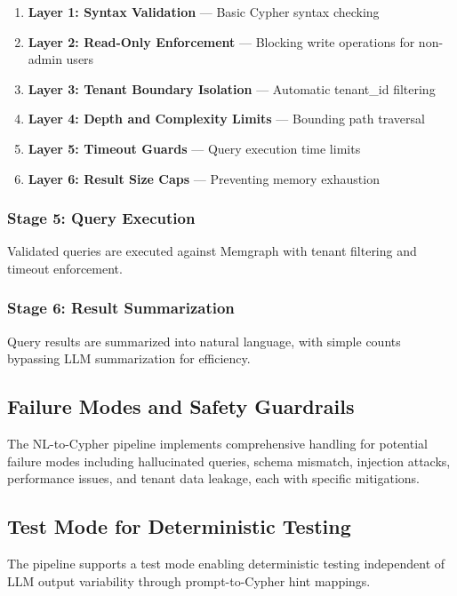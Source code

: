 \documentclass[a4paper,twoside]{sapthesis}
\begin{document}
\begin{enumerate}
    \item \textbf{Layer 1: Syntax Validation} --- Basic Cypher syntax checking
    \item \textbf{Layer 2: Read-Only Enforcement} --- Blocking write operations for non-admin users
    \item \textbf{Layer 3: Tenant Boundary Isolation} --- Automatic tenant\_id filtering
    \item \textbf{Layer 4: Depth and Complexity Limits} --- Bounding path traversal
    \item \textbf{Layer 5: Timeout Guards} --- Query execution time limits
    \item \textbf{Layer 6: Result Size Caps} --- Preventing memory exhaustion
\end{enumerate}

\subsubsection{Stage 5: Query Execution}

Validated queries are executed against Memgraph with tenant filtering and timeout enforcement.

\subsubsection{Stage 6: Result Summarization}

Query results are summarized into natural language, with simple counts bypassing LLM summarization for efficiency.

\subsection{Failure Modes and Safety Guardrails}
\label{subsec:failure-modes}

The NL-to-Cypher pipeline implements comprehensive handling for potential failure modes including hallucinated queries, schema mismatch, injection attacks, performance issues, and tenant data leakage, each with specific mitigations.

\subsection{Test Mode for Deterministic Testing}

The pipeline supports a test mode enabling deterministic testing independent of LLM output variability through prompt-to-Cypher hint mappings.
\end{document}
